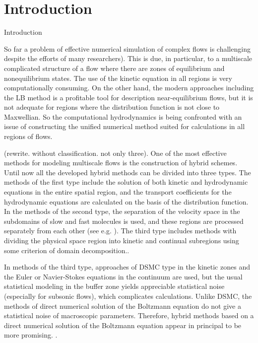 \documentclass[]{elsarticle} %
\begin{document}
\linenumbers

\section{Introduction}\label{sec:intro}

Introduction

So far a problem of effective numerical simulation of complex flows is challenging despite the efforts of many researchers). This is due, in particular, to a multiscale complicated structure of a flow where there are zones of equilibrium and nonequilibrium states. The use of the kinetic equation in all regions is very computationally consuming. On the other hand, the modern approaches including the LB method is a profitable tool for description near-equilibrium flows, but it is not adequate for regions where the distribution function is not close to Maxwellian. So the computational hydrodynamics is being confronted with an issue of constructing the unified numerical method suited for calculations in all regions of flows.

(rewrite. without classification. not only three).
One of the most effective methods for modeling multiscale flows is the construction of hybrid schemes. Until now all the developed hybrid methods can be divided into three types. The methods of the first type include the solution of both kinetic and hydrodynamic equations in the entire spatial region, and the transport coefficients for the hydrodynamic equations are calculated on the basis of the distribution function. In the methods of the second type, the separation of the velocity space in the subdomains of slow and fast molecules is used, and these regions are processed separately from each other (see e.g. \cite{Kolobov2013}). The third type includes methods with dividing the physical space region into kinetic and continual subregions using some criterion of domain decomposition.\cite{Dimarco2014}.

In methods of the third type, approaches of DSMC type in the kinetic zones and the Euler or Navier-Stokes equations in the continuum are used, but the usual statistical modeling in the buffer zone yields appreciable statistical noise (especially for subsonic flows), which complicates calculations. Unlike DSMC, the methods of direct numerical solution of the Boltzmann equation do not give a statistical noise of macroscopic parameters. Therefore, hybrid methods based on a direct numerical solution of the Boltzmann equation appear in principal to be more promising. \cite{Staso2016short, Staso2016long, Staso2018}.
\end{document}
